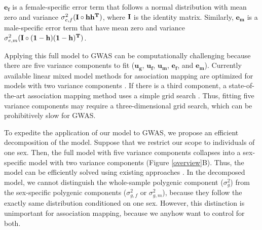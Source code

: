 \documentclass[11pt]{article}
\begin{document}
$\mathbf{e_f}$ is a female-specific error term that follows a normal distribution with mean zero and variance $\sigma_{e,f}^2(\bf{I\circ hh^T})$, 
where $\bf{I}$ is the identity matrix. 
Similarly, $\mathbf{e_m}$ is a male-specific error term that have mean zero and variance $\sigma_{e,m}^2(\bf{I \circ (1-h)(1-h)^T})$.

Applying this full model to GWAS can be computationally challenging 
because there are five variance components to fit ($\mathbf{u_g}$, $\mathbf{u_f}$, $\mathbf{u_m}$, $\mathbf{e_f}$, and $\mathbf{e_m}$).
Currently available linear mixed model methods for association mapping are optimized for models with two variance components \citep{Zhou:NatGenet:2012,Kang2010,Kang:2008bx}.
If there is a third component, a state-of-the-art association mapping method uses a simple grid search \citep{Lippert:NatureMethods:2011}. 
Thus, fitting five variance components may require a three-dimensional grid search, which can be prohibitively slow for GWAS.

To expedite the application of our model to GWAS, we propose an efficient decomposition of the model.
Suppose that we restrict our scope to individuals of one sex.
Then, the full model with five variance components collapses into a sex-specific model with two variance components (Figure \ref{overview}B).
Thus, the model can be efficiently solved using existing approaches \citep{Zhou:NatGenet:2012,Kang2010,Kang:2008bx}.
In the decomposed model, 
we cannot
distinguish the whole-sample polygenic component ($\sigma^2_g$) from the sex-specific polygenic components ($\sigma^2_{g,f}$ or $\sigma^2_{g,m}$),
because they follow the exactly same distribution conditioned on one sex.
However, this distinction is unimportant for association mapping, 
because we anyhow want to control for both. 
\end{document}
